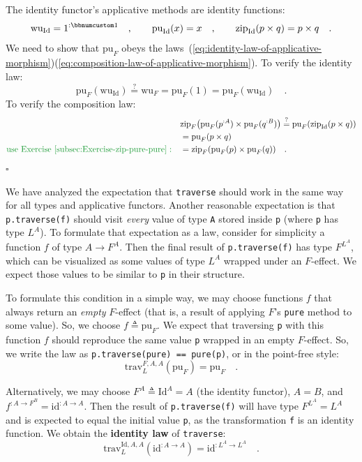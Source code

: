 The identity functor\textsf{'}s applicative methods are identity functions:
\[
\text{wu}_{\text{Id}}=1^{:\bbnum 1}\quad,\quad\quad\text{pu}_{\text{Id}}(x)=x\quad,\quad\quad\text{zip}_{\text{Id}}(p\times q)=p\times q\quad.
\]
We need to show that $\text{pu}_{F}$ obeys the laws~(\ref{eq:identity-law-of-applicative-morphism})\textendash (\ref{eq:composition-law-of-applicative-morphism}).
To verify the identity law:
\[
\text{pu}_{F}(\text{wu}_{\text{Id}})\overset{?}{=}\text{wu}_{F}=\text{pu}_{F}(1)=\text{pu}_{F}(\text{wu}_{\text{Id}})\quad.
\]
To verify the composition law:
\begin{align*}
 & \text{zip}_{F}\big(\text{pu}_{F}(p^{:A})\times\text{pu}_{F}(q^{:B})\big)\overset{?}{=}\text{pu}_{F}(\text{zip}_{\text{Id}}(p\times q))\\
 & =\text{pu}_{F}(p\times q)\\
{\color{greenunder}\text{use Exercise~\ref{subsec:Exercise-zip-pure-pure}}:}\quad & =\text{zip}_{F}(\text{pu}_{F}(p)\times\text{pu}_{F}(q))\quad.
\end{align*}
$\square$

We have analyzed the expectation that \lstinline!traverse! should
work in the same way for all types and applicative functors. Another
reasonable expectation is that \lstinline!p.traverse(f)! should visit
\emph{every} value of type \lstinline!A! stored inside \lstinline!p!
(where \lstinline!p! has type $L^{A}$). To formulate that expectation
as a law, consider for simplicity a function $f$ of type $A\rightarrow F^{A}$.
Then the final result of \lstinline!p.traverse(f)! has type $F^{L^{A}}$,
which can be visualized as some values of type $L^{A}$ wrapped under
an $F$-effect. We expect those values to be similar to \lstinline!p!
in their structure.

To formulate this condition in a simple way, we may choose functions
$f$ that always return an \emph{empty} $F$-effect (that is, a result
of applying $F$\textsf{'}s \lstinline!pure! method to some value). So, we
choose $f\triangleq\text{pu}_{F}$. We expect that traversing \lstinline!p!
with this function $f$ should reproduce the same value \lstinline!p!
wrapped in an empty $F$-effect. So, we write the law as \lstinline!p.traverse(pure) == pure(p)!,
or in the point-free style:
\begin{equation}
\text{trav}_{L}^{F,A,A}(\text{pu}_{F})=\text{pu}_{F}\quad.\label{eq:traverse-identity-law-with-pure}
\end{equation}

Alternatively, we may choose $F^{A}\triangleq\text{Id}^{A}=A$ (the
identity functor), $A=B$, and $f^{:A\rightarrow F^{B}}=\text{id}^{:A\rightarrow A}$.
Then the result of \lstinline!p.traverse(f)! will have type $F^{L^{A}}=L^{A}$
and is expected to equal the initial value \lstinline!p!, as the
transformation \lstinline!f! is an identity function. We obtain the
\textbf{identity law}
of \lstinline!traverse!:
\begin{equation}
\text{trav}_{L}^{\text{Id},A,A}(\text{id}^{:A\rightarrow A})=\text{id}^{:L^{A}\rightarrow L^{A}}\quad.\label{eq:traverse-identity-law}
\end{equation}

